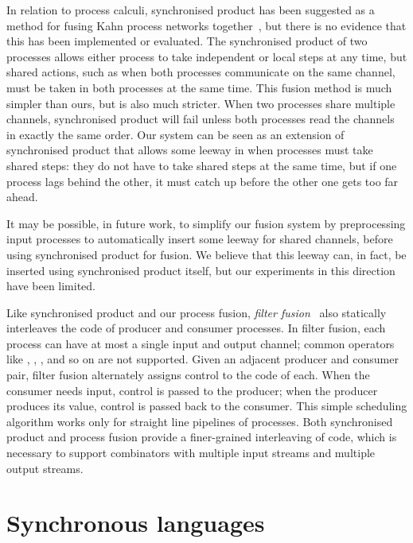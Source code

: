 In relation to process calculi, synchronised product has been suggested as a method for fusing Kahn process networks together~\cite{fradet2004network}, but there is no evidence that this has been implemented or evaluated.
The synchronised product of two processes allows either process to take independent or local steps at any time, but shared actions, such as when both processes communicate on the same channel, must be taken in both processes at the same time.
This fusion method is much simpler than ours, but is also much stricter.
When two processes share multiple channels, synchronised product will fail unless both processes read the channels in exactly the same order.
Our system can be seen as an extension of synchronised product that allows some leeway in when processes must take shared steps: they do not have to take shared steps at the same time, but if one process lags behind the other, it must catch up before the other one gets too far ahead.

It may be possible, in future work, to simplify our fusion system by preprocessing input processes to automatically insert some leeway for shared channels, before using synchronised product for fusion.
We believe that this leeway can, in fact, be inserted using synchronised product itself, but our experiments in this direction have been limited.

Like synchronised product and our process fusion, \emph{filter fusion}~\citep{proebsting1996filter} also statically interleaves the code of producer and consumer processes.
In filter fusion, each process can have at most a single input and output channel; common operators like \Hs@zip@, \Hs@unzip@, \Hs@append@, \Hs@partition@ and so on are not supported.
Given an adjacent producer and consumer pair, filter fusion alternately assigns control to the code of each.
When the consumer needs input, control is passed to the producer; when the producer produces its value, control is passed back to the consumer.
This simple scheduling algorithm works only for straight line pipelines of processes.
Both synchronised product and process fusion provide a finer-grained interleaving of code, which is necessary to support combinators with multiple input streams and multiple output streams.

\section{Synchronous languages}
\label{related/synchronous-languages}

